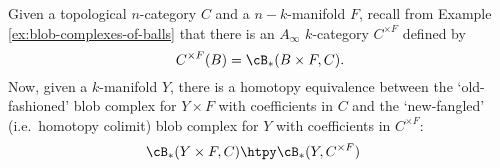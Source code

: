 \begin{thm} \label{product_thm}
Given a topological $n$-category $C$ and a $n{-}k$-manifold $F$, recall from Example \ref{ex:blob-complexes-of-balls} that there is an  $A_\infty$ $k$-category $C^{\times F}$ defined by
\begin{equation*}
C^{\times F}(B) = \cB_*(B \times F, C).
\end{equation*}
Now, given a $k$-manifold $Y$, there is a homotopy equivalence between the `old-fashioned' blob complex for $Y \times F$ with coefficients in $C$ and the `new-fangled' (i.e.\ homotopy colimit) blob complex for $Y$ with coefficients in $C^{\times F}$:
\begin{align*}
\cB_*(Y \times F, C) & \htpy \cB_*(Y, C^{\times F})
\end{align*}
\end{thm}


